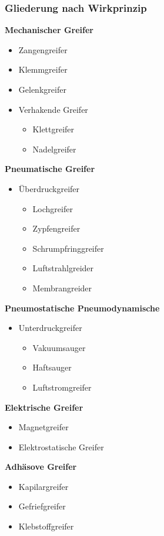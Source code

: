\begin{minipage}[t]{0.4\linewidth}
    \subsubsection{Gliederung nach Wirkprinzip}
        \textbf{Mechanischer Greifer}
        \begin{itemize}
            \item Zangengreifer
            \item Klemmgreifer
            \item Gelenkgreifer
            \item Verhakende Greifer
            \begin{itemize}
                \item Klettgreifer
                \item Nadelgreifer
            \end{itemize}
        \end{itemize}

        \textbf{Pneumatische Greifer}
        \begin{itemize}
            \item Überdruckgreifer
            \begin{itemize}
                \item Lochgreifer
                \item Zypfengreifer
                \item Schrumpfringgreifer
                \item Luftstrahlgreider
                \item Membrangreider
            \end{itemize}
        \end{itemize}

        \textbf{Pneumostatische Pneumodynamische}
        \begin{itemize}
            \item Unterdruckgreifer
            \begin{itemize}
                \item Vakuumsauger
                \item Haftsauger
                \item Luftstromgreifer
            \end{itemize}
        \end{itemize}

        \textbf{Elektrische Greifer}
        \begin{itemize}
            \item Magnetgreifer
            \item Elektrostatische Greifer
        \end{itemize}
           
        \textbf{Adhäsove Greifer}
        \begin{itemize}
            \item Kapilargreifer
            \item Gefriefgreifer
            \item Klebstoffgreifer
        \end{itemize}
\end{minipage}
\clearpage

